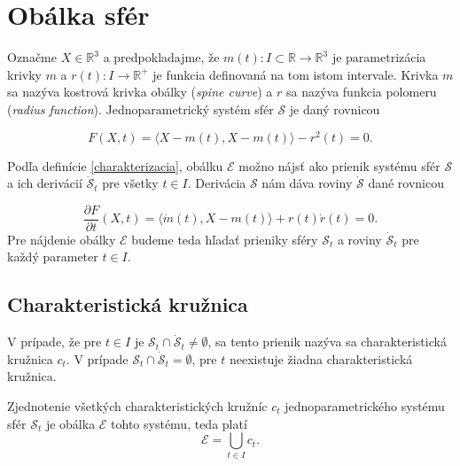 \chapter{Obálka sfér}
Označme $X \in \mathbb{R}^3$ a predpokladajme, že $m(t) \colon I \subset \mathbb{R} \rightarrow \mathbb{R}^3$ je parametrizácia krivky $m$ a $r(t) \colon I \rightarrow \mathbb{R}^{+}$ je funkcia definovaná na tom istom intervale. Krivka $m$ sa nazýva kostrová krivka obálky (\textit{spine curve}) a $r$ sa nazýva funkcia polomeru (\textit{radius function}). Jednoparametrický systém sfér $\mathcal{S}$ je daný rovnicou

$$
F(X, t) = \langle X - m(t), X - m(t) \rangle - r^2(t)= 0.
$$

Podľa definície \ref{charakterizacia}, obálku $\mathcal{E}$ možno nájsť ako prienik systému sfér $\mathcal{S}$ a ich derivácií $\mathcal{\dot{S}}_t$ pre všetky $t \in I$. Derivácia $\mathcal{S}$ nám dáva roviny $\mathcal{\dot{S}}$ dané rovnicou

$$
\dfrac{\partial F}{\partial t} (X, t) = \langle \dot{m}(t), X - m(t) \rangle + r(t) \dot{r}(t) = 0.
$$
Pre nájdenie obálky $\mathcal{E}$ budeme teda hľadať prieniky sféry $\mathcal{S}_t$ a roviny $\mathcal{\dot{S}}_t $ pre každý parameter $t \in I$.

\section{Charakteristická kružnica}
\begin{definition}
V prípade, že pre $t \in I$ je $\mathcal{S}_{t} \cap \mathcal{\dot{S}}_{t} \neq \emptyset$, sa tento prienik nazýva sa charakteristická kružnica $c_{t}$. V prípade $\mathcal{S}_{t} \cap \mathcal{\dot{S}}_{t} = \emptyset$, pre \(t\) neexistuje žiadna charakteristická kružnica.
\end{definition}

\begin{lemma} \label{lema o zjednoteni charakteristickych kruznic}
Zjednotenie všetkých charakteristických kružníc $c_{t}$ jednoparametrického systému sfér $\mathcal{S}_t$ je obálka $\mathcal{E}$ tohto systému, teda platí $$\mathcal{E} = \bigcup_{t \in I} c_{t}.$$
\end{lemma}

